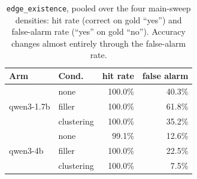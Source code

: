 \documentclass[11pt]{article}
\begin{document}
\begin{table}[H]
\centering
\small
\setlength{\tabcolsep}{3pt}
\begin{tabular}{llrr}
\toprule
Arm & Cond. & hit rate & false alarm \\
\midrule
\multirow{3}{*}{qwen3-1.7b} & none       & 100.0\% & 40.3\% \\
                            & filler     & 100.0\% & 61.8\% \\
                            & clustering & 100.0\% & 35.2\% \\
\midrule
\multirow{3}{*}{qwen3-4b}   & none       & 99.1\%  & 12.6\% \\
                            & filler     & 100.0\% & 22.5\% \\
                            & clustering & 100.0\% & 7.5\% \\
\bottomrule
\end{tabular}
\caption{\texttt{edge\_existence}, pooled over the four main-sweep
densities: hit rate (correct on gold ``yes'') and false-alarm rate (``yes''
on gold ``no''). Accuracy changes almost entirely through the false-alarm
rate.}
\label{tab:booleanbias}
\end{table}

\begin{table}[H]
\centering
\footnotesize
\setlength{\tabcolsep}{3pt}
\caption{\texttt{edge\_existence}, main sweep: change in sensitivity $d'$
and criterion $c$ against \texttt{none}, averaged over the four densities
(log-linear correction; $95\%$ bootstrap CI for $\Delta d'$). With the hit
rate at ceiling, $d'$ and $c$ are not separately identifiable.}
\label{tab:sdt}
\end{table}
\end{document}
